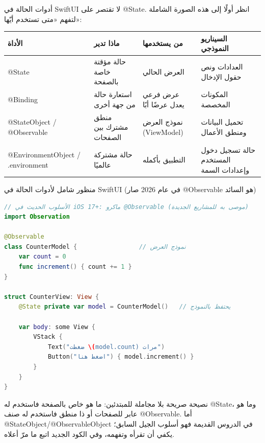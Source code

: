 


أدوات الحالة في SwiftUI لا تقتصر على @State. انظر أولًا إلى هذه الصورة الشاملة لتفهم «متى تستخدم أيّها»:

\begin{center}
\begin{tabularx}{\linewidth}{|X|X|X|X|}
\hline
\textbf{الأداة} & \textbf{ماذا تدير} & \textbf{من يستخدمها} & \textbf{السيناريو النموذجي} \tabularnewline
\hline
@State & حالة مؤقتة خاصة بالصفحة & العرض الحالي & العدادات ونص حقول الإدخال \tabularnewline
@Binding & استعارة حالة من جهة أخرى & عرض فرعي يعدل عرضًا أبًا & المكونات المخصصة \tabularnewline
@StateObject / @Observable & منطق مشترك بين الصفحات & نموذج العرض (ViewModel) & تحميل البيانات ومنطق الأعمال \tabularnewline
@EnvironmentObject / .environment & حالة مشتركة عالميًا & التطبيق بأكمله & حالة تسجيل دخول المستخدم وإعدادات السمة \tabularnewline
\hline
\end{tabularx}
\end{center}

\begin{center}\small\color{gray}منظور شامل لأدوات الحالة في SwiftUI (في عام 2026 صار @Observable هو السائد)\end{center}

\begin{lstlisting}[language=Swift]
// الأسلوب الحديث في iOS 17+: ماكرو @Observable (موصى به للمشاريع الجديدة)
import Observation

@Observable
class CounterModel {                 // نموذج العرض
    var count = 0
    func increment() { count += 1 }
}

struct CounterView: View {
    @State private var model = CounterModel()   // يحتفظ بالنموذج

    var body: some View {
        VStack {
            Text("ضغطت \(model.count) مرات")
            Button("اضغط هنا") { model.increment() }
        }
    }
}
\end{lstlisting}

نصيحة صريحة بلا مجاملة للمبتدئين: ما هو خاص بالصفحة فاستخدم له @State، وما هو عابر للصفحات أو ذا منطق فاستخدم له صنف @Observable. أما @StateObject/@ObservableObject في الدروس القديمة فهو أسلوب الجيل السابق؛ يكفي أن تقرأه وتفهمه، وفي الكود الجديد اتبع ما مرّ أعلاه.

